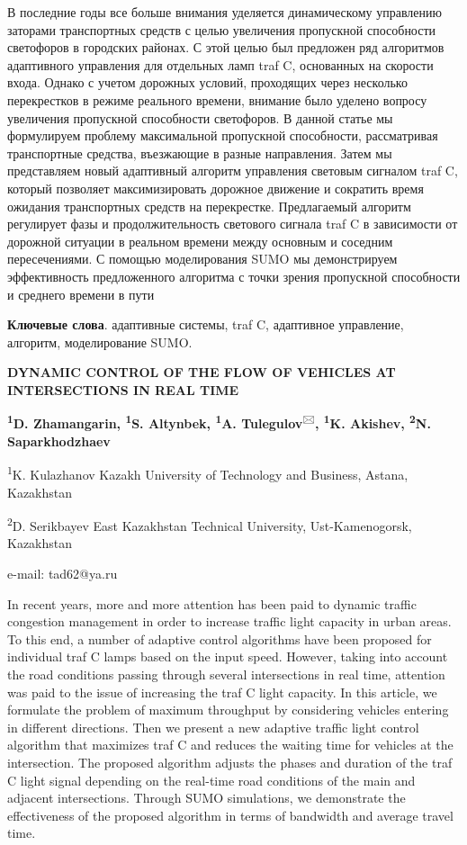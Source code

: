 В последние годы все больше внимания уделяется динамическому управлению
заторами транспортных средств с целью увеличения пропускной способности
светофоров в городских районах. С этой целью был предложен ряд
алгоритмов адаптивного управления для отдельных ламп traf C, основанных
на скорости входа. Однако с учетом дорожных условий, проходящих через
несколько перекрестков в режиме реального времени, внимание было уделено
вопросу увеличения пропускной способности светофоров. В данной статье мы
формулируем проблему максимальной пропускной способности, рассматривая
транспортные средства, въезжающие в разные направления. Затем мы
представляем новый адаптивный алгоритм управления световым сигналом traf
C, который позволяет максимизировать дорожное движение и сократить время
ожидания транспортных средств на перекрестке. Предлагаемый алгоритм
регулирует фазы и продолжительность светового сигнала traf C в
зависимости от дорожной ситуации в реальном времени между основным и
соседним пересечениями. С помощью моделирования SUMO мы демонстрируем
эффективность предложенного алгоритма с точки зрения пропускной
способности и среднего времени в пути

{\bfseries Ключевые слова}. адаптивные системы, traf C, адаптивное
управление, алгоритм, моделирование SUMO.
\begin{center}

{\large\bfseries DYNAMIC CONTROL OF THE FLOW OF VEHICLES AT INTERSECTIONS IN REAL
TIME}

{\bfseries \textsuperscript{1}D. Zhamangarin, \textsuperscript{1}S.
Altynbek, \textsuperscript{1}A. Tulegulov}\textsuperscript{🖂}{\bfseries ,
\textsuperscript{1}K. Akishev, \textsuperscript{2}N. Saparkhodzhaev}

\textsuperscript{1}K. Kulazhanov Kazakh University of Technology and
Business, Astana, Kazakhstan

\textsuperscript{2}D. Serikbayev East Kazakhstan Technical University,
Ust-Kamenogorsk, Kazakhstan

e-mail: tad62@ya.ru
\end{center}

In recent years, more and more attention has been paid to dynamic
traffic congestion management in order to increase traffic light
capacity in urban areas. To this end, a number of adaptive control
algorithms have been proposed for individual traf C lamps based on the
input speed. However, taking into account the road conditions passing
through several intersections in real time, attention was paid to the
issue of increasing the traf C light capacity. In this article, we
formulate the problem of maximum throughput by considering vehicles
entering in different directions. Then we present a new adaptive traffic
light control algorithm that maximizes traf C and reduces the waiting
time for vehicles at the intersection. The proposed algorithm adjusts
the phases and duration of the traf C light signal depending on the
real-time road conditions of the main and adjacent intersections.
Through SUMO simulations, we demonstrate the effectiveness of the
proposed algorithm in terms of bandwidth and average travel time.

